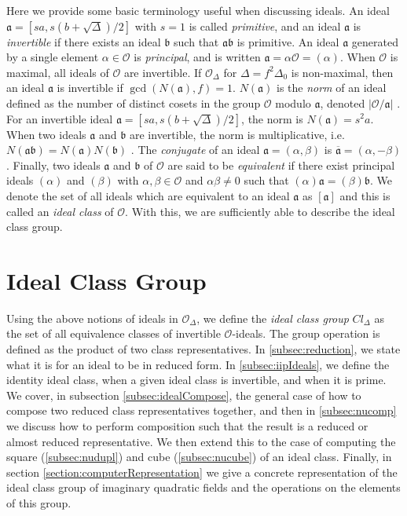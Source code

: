\documentclass{ucalgthes1}
\theoremstyle{plain}
\theoremstyle{definition}
\newcommand{\OO}{\mathcal{O}}
\begin{document}
Here we provide some basic terminology useful when discussing ideals.  An ideal $\mathfrak{a} = [sa, s(b+\sqrt{\Delta})/2]$ with $s=1$ is called \emph{primitive}, and an ideal $\mathfrak{a}$ is \emph{invertible} if there exists an ideal $\mathfrak{b}$ such that $\mathfrak{a}\mathfrak{b}$ is primitive.  An ideal $\mathfrak{a}$ generated by a single element $\alpha \in \OO$ is \emph{principal}, and is written $\mathfrak{a} = \alpha \OO = (\alpha)$.  When $\OO$ is maximal, all ideals of $\OO$ are invertible.  If $\OO_\Delta$ for $\Delta = f^2\Delta_0$ is non-maximal, then an ideal $\mathfrak{a}$ is invertible if $\gcd(N(\mathfrak{a}),f)=1$.  $N(\mathfrak{a})$ is the \emph{norm} of an ideal defined as the number of distinct cosets in the group $\OO$ modulo $\mathfrak{a}$, denoted $|\OO/\mathfrak{a}|$ \cite[pp.~90-91]{Jac09}.  For an invertible ideal $\mathfrak{a} = [sa, s(b+\sqrt{\Delta})/2]$, the norm is $N(\mathfrak{a}) = s^2a$.  When two ideals $\mathfrak{a}$ and $\mathfrak{b}$ are invertible, the norm is multiplicative, i.e. $N(\mathfrak{a}\mathfrak{b}) = N(\mathfrak{a})N(\mathfrak{b})$ \cite[p.~92]{Jac09}.  The \emph{conjugate} of an ideal $\mathfrak{a} = (\alpha, \beta)$ is $\overline{\mathfrak{a}} = (\alpha, -\beta)$.  Finally, two ideals $\mathfrak{a}$ and $\mathfrak{b}$ of $\OO$ are said to be \emph{equivalent} if there exist principal ideals $(\alpha)$ and $(\beta)$ with  $\alpha, \beta \in \OO$ and $\alpha\beta \neq 0$ such that $(\alpha)\mathfrak{a} = (\beta)\mathfrak{b}$.  We denote the set of all ideals which are equivalent to an ideal $\mathfrak{a}$ as $[\mathfrak{a}]$ and this is called an \emph{ideal class} of $\OO$.  With this, we are  sufficiently able to describe the ideal class group.


\bigbreak
\section{Ideal Class Group}

Using the above notions of ideals in $\OO_\Delta$, we define the \emph{ideal class group} $Cl_\Delta$ as the set of all equivalence classes of invertible $\OO$-ideals.  The group operation is defined as the product of two class representatives.  In \ref{subsec:reduction}, we state what it is for an ideal to be in reduced form.  In \ref{subsec:iipIdeals}, we define the identity ideal class, when a given ideal class is invertible, and when it is prime.  We cover, in subsection \ref{subsec:idealCompose}, the general case of how to compose two reduced class representatives together, and then in \ref{subsec:nucomp} we discuss how to perform composition such that the result is a reduced or almost reduced representative.  We then extend this to the case of computing the square (\ref{subsec:nudupl}) and cube (\ref{subsec:nucube}) of an ideal class.  Finally, in section \ref{section:computerRepresentation} we give a concrete representation of the ideal class group of imaginary quadratic fields and the operations on the elements of this group. 
\end{document}

